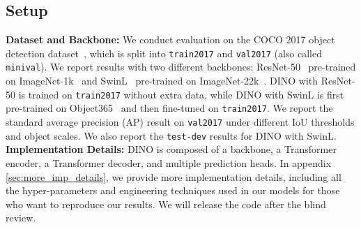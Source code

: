 \documentclass[runningheads]{llncs}
\begin{document}
\subsection{Setup}\label{sec:setup}
\textbf{Dataset and Backbone:}
We conduct evaluation on the COCO 2017 object detection dataset~\cite{lin2015microsoft}, which is split into \texttt{train2017} and \texttt{val2017} (also called \texttt{minival}). We report results with two different backbones: ResNet-50~\cite{he2015deep} pre-trained on ImageNet-1k~\cite{deng2009imagenet} and SwinL~\cite{liu2021swin} pre-trained on ImageNet-22k~\cite{deng2009imagenet}. 
DINO with ResNet-50 is trained on \texttt{train2017} without extra data, while DINO with SwinL is first pre-trained on Object365~\cite{shao2019objects365} and then fine-tuned on \texttt{train2017}.
We report the standard average precision (AP) result on \texttt{val2017} under different IoU thresholds and object scales. We also report the \texttt{test-dev} results for DINO with SwinL.
\\
\textbf{Implementation Details:}
 DINO is composed of a backbone, a Transformer encoder, a Transformer decoder, and multiple prediction heads. 
In appendix \ref{sec:more_imp_details}, we provide more implementation details, including all the hyper-parameters and engineering techniques used in our models for those who want to reproduce our results. We will release the code after the blind review.
\end{document}
